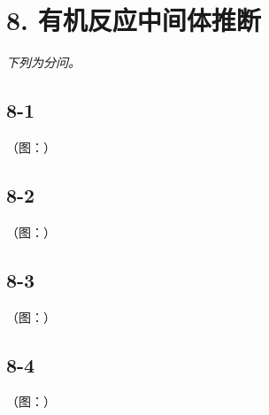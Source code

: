 \section*{8. 有机反应中间体推断}
\textit{下列为分问。}

\subsection*{8-1}
（图：）

\subsection*{8-2}
（图：）

\subsection*{8-3}
（图：）

\subsection*{8-4}
（图：）
